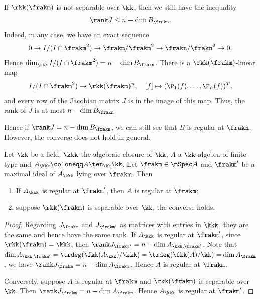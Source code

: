     \begin{remark}\label{rmk: rank of Jacobian matrix for inseparable extensions}
        If \(\rkk(\frakm)\) is not separable over \(\kk\), then we still have the inequality
        \[ \rank J \leq n - \dim B_\frakn. \]
        Indeed, in any case, we have an exact sequence
        \[ 0 \to I/(I\cap \frakm^2) \to \frakm/\frakm^2 \to \frakn/\frakn^2 \to 0. \]
        Hence \(\dim_\rkk I/(I\cap \frakm^2) = n - \dim B_\frakn\).
        There is a \(\rkk(\frakm)\)-linear map
        \[ I/(I\cap \frakm^2) \to \rkk(\frakm)^n, \quad [f] \mapsto (\P_1(f), \ldots, \P_n(f))^T, \]
        and every row of the Jacobian matrix \(J\) is in the image of this map.
        Thus, the rank of \(J\) is at most \(n - \dim B_\frakn\).

        Hence if \(\rank J = n - \dim B_\frakn\), we can still see that \(B\) is regular at \(\frakn\).
        However, the converse does not hold in general.
    \end{remark}

    \begin{proposition}\label{prop: regularity under base field extension}
        Let \(\kk\) be a field, \(\kkk\) the algebraic closure of \(\kk\), \(A\) a \(\kk\)-algebra of finite type and \(A_\kkk \coloneqq A \ten_{\kk} \kk\).
        Let \(\frakm \in \mSpec A\) and \(\frakm'\) be a maximal ideal of \(A_\kkk\) lying over \(\frakm\).
        Then 
        \begin{enumerate}
            \item If \(A_\kkk\) is regular at \(\frakm'\), then \(A\) is regular at \(\frakm\);
            \item suppose \(\rkk(\frakm)\) is separable over \(\kk\), the converse holds.
        \end{enumerate}
    \end{proposition}
    \begin{proof}
        Regarding \(J_\frakm\) and \(J_{\frakm'}\) as matrices with entries in \(\kkk\), they are the same and hence have the same rank.
        If \(A_\kkk\) is regular at \(\frakm'\), since \(\rkk(\frakm) = \kkk\), then \(\rank J_{\frakm'} = n - \dim A_{\kkk,\frakm'}\).
        Note that \(\dim A_{\kkk,\frakm'} = \trdeg(\fkk(A_\kkk)/\kkk) = \trdeg(\fkk(A)/\kk) = \dim A_\frakm\), we have \(\rank J_{\frakm} = n - \dim A_\frakm\).
        Hence \(A\) is regular at \(\frakm\).

        Conversely, suppose \(A\) is regular at \(\frakm\) and \(\rkk(\frakm)\) is separable over \(\kk\).
        Then \(\rank J_\frakm = n - \dim A_\frakm\).
        Hence \(A_\kkk\) is regular at \(\frakm'\).
    \end{proof}

